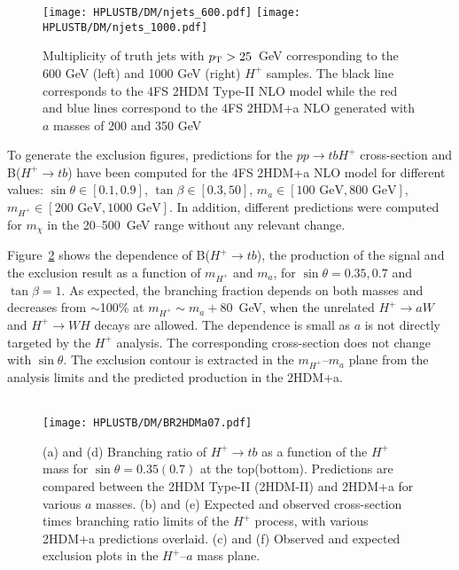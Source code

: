 \begin{figure}[htb]
    \RawFloats
    \centering
    \texttt{[image: HPLUSTB/DM/njets\_600.pdf]}
    \texttt{[image: HPLUSTB/DM/njets\_1000.pdf]}
    \caption{Multiplicity of truth jets with $p_{\text{T}}>25$~GeV corresponding to the 600 GeV (left) and 1000 GeV (right) $H^+$ samples. The black line corresponds to the 4FS 2HDM Type-II NLO model
    while the red and blue lines correspond to the 4FS 2HDM+a NLO generated with $a$ masses of 200 and 350 GeV}
    \label{Hplustb:2hdmatruth}
\end{figure}

To generate the exclusion figures, predictions for the $pp\to tbH^+$ cross-section and B($H^+\to tb$) have been computed for the 4FS 2HDM+a NLO model for different values: $\sin\theta\in[0.1,0.9]$, $\tan\beta\in[0.3,50]$, $m_a\in[100\text{ GeV},800\text{ GeV}]$, $m_{H^+}\in[200\text{ GeV},1000\text{ GeV}]$. In addition, different predictions were computed for $m_\chi$ in the 20--500~GeV range without any relevant change.

Figure~\ref{Hplustb:BRprodexclmassvsmass} shows the dependence of B($H^+\to tb$), the production of the signal and the exclusion result as a function of $m_{H^+}$ and $m_a$, for $\sin\theta=0.35,0.7$ and $\tan\beta=1$. As expected, the branching fraction depends on both masses and decreases from $\sim$100\% at $m_{H^+}\sim m_a+80$~GeV, when the unrelated $H^+\to aW$ and $H^+\to WH$ decays are allowed. The dependence is small as $a$ is not directly targeted by the $H^+$ analysis. The corresponding cross-section does not change with $\sin\theta$. The exclusion contour is extracted in the $m_{H^+}$--$m_a$ plane from the analysis limits and the predicted production in the 2HDM+a.

\begin{figure}[htb]
    \RawFloats
    \centering
        \\
       {\texttt{[image: HPLUSTB/DM/BR2HDMa07.pdf]}} 
    \caption{(a) and (d) Branching ratio of $H^+\to tb$ as a function of the $H^+$ mass for $\sin\theta=0.35(0.7)$ at the top(bottom). Predictions are compared between the 2HDM Type-II (2HDM-II) and 2HDM+a for various $a$ masses. (b) and (e) Expected and observed cross-section times branching ratio limits of the $H^+$ process, with various 2HDM+a predictions overlaid. (c) and (f) Observed and expected exclusion plots in the $H^+$--$a$ mass plane.}
    \label{Hplustb:BRprodexclmassvsmass}
\end{figure}

